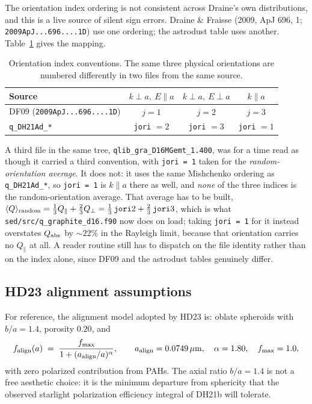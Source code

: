 \documentclass{my_memo}
\newcommand{\code}[1]{\texttt{#1}}
\newcommand{\um}{\ensuremath{\,\mu\mathrm{m}}}
\newcommand{\aalign}{\ensuremath{a_{\rm align}}}
\newcommand{\falign}{\ensuremath{f_{\rm align}}}
\begin{document}
The orientation index ordering is not consistent across Draine's own
distributions, and this is a live source of silent sign errors. Draine \&
Fraisse (2009, ApJ 696, 1; \code{2009ApJ...696....1D}) use one ordering;
the astrodust table uses another. Table~\ref{tab:jori} gives the mapping.

\begin{table}[!ht]
\centering
\caption{Orientation index conventions. The same three physical
orientations are numbered differently in two files from the same source.}
\label{tab:jori}
\begin{tabular}{lccc}
\toprule
Source & $k \perp a,\ E \parallel a$ & $k \perp a,\ E \perp a$ & $k \parallel a$ \\
\midrule
DF09 (\code{2009ApJ...696....1D}) & $j = 1$ & $j = 2$ & $j = 3$ \\
\code{q\_DH21Ad\_*}               & \code{jori} $= 2$ & \code{jori} $= 3$ & \code{jori} $= 1$ \\
\bottomrule
\end{tabular}
\end{table}

A third file in the same tree, \code{qlib\_gra\_D16MGemt\_1.400}, was for a
time read as though it carried a third convention, with \code{jori = 1}
taken for the \emph{random-orientation average}. It does not: it uses the
same Mishchenko ordering as \code{q\_DH21Ad\_*}, so \code{jori = 1} is
$k \parallel a$ there as well, and \emph{none} of the three indices is the
random-orientation average. That average has to be built,
$\langle Q\rangle_{\rm random} = \tfrac{1}{3}Q_\parallel +
\tfrac{2}{3}Q_\perp = \tfrac{1}{3}\,\code{jori}2 + \tfrac{2}{3}\,\code{jori}3$,
which is what \code{sed/src/q\_graphite\_d16.f90} now does on load; taking
\code{jori = 1} for it instead overstates $Q_{\rm abs}$ by ${\sim}22\%$ in the
Rayleigh limit, because that orientation carries no $Q_\parallel$ at all. A
reader routine still has to dispatch on the file identity rather than on the
index alone, since DF09 and the astrodust tables genuinely differ.

\subsection{HD23 alignment assumptions}

For reference, the alignment model adopted by HD23 is: oblate spheroids
with $b/a = 1.4$, porosity $0.20$, and
\begin{equation}
  \falign(a) \;=\; \frac{f_{\max}}{1 + (\aalign/a)^{\alpha}},
  \qquad
  \aalign = 0.0749\um,\quad \alpha = 1.80,\quad f_{\max} = 1.0,
  \label{eq:falign}
\end{equation}
with zero polarized contribution from PAHs. The axial ratio $b/a = 1.4$
is not a free aesthetic choice: it is the minimum departure from
sphericity that the observed starlight polarization efficiency integral
of DH21b will tolerate.
\end{document}
